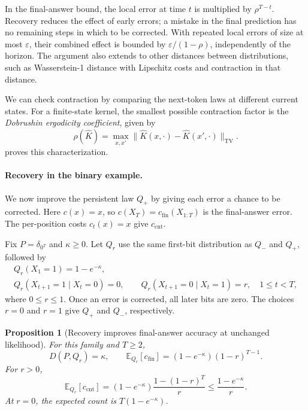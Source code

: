 \documentclass[11pt,twoside]{article}
\newcommand{\E}{\mathbb E}
\newcommand{\KL}{D}
\newcommand{\tv}[1]{\lVert #1\rVert_{\mathrm{TV}}}
\newtheorem{proposition}[theorem]{Proposition}
\theoremstyle{definition}
\theoremstyle{remark}
\begin{document}
In the final-answer bound, the local error at time \(t\) is multiplied
by \(\rho^{T-t}\). Recovery reduces the effect of
early errors; a mistake in the final prediction has no remaining
steps in which to be corrected. With repeated local errors of size
at most \(\varepsilon\), their combined effect is bounded by
\(\varepsilon/(1-\rho)\), independently of the horizon.
The argument also extends to other distances between distributions,
such as Wasserstein-1 distance with Lipschitz costs and contraction
in that distance.

We can check contraction by comparing the next-token laws at different
current states. For a finite-state kernel, the smallest possible contraction
factor is the \emph{Dobrushin ergodicity coefficient}, given by
\begin{equation}
 \rho(\widehat K)
 =\max_{x,x'}\tv{\widehat K(x,\cdot)-\widehat K(x',\cdot)}.
 \label{eq:dobrushin}
\end{equation}
 proves this characterization.

\paragraph{Recovery in the binary example.}
We now improve the persistent law \(Q_+\) by giving
each error a chance to be corrected. Here \(c(x)=x\), so
\(c(X_T)=c_{\mathrm{fin}}(X_{1:T})\) is the final-answer error.
The per-position costs \(c_t(x)=x\) give \(c_{\mathrm{cnt}}\).

Fix \(P=\delta_{0^T}\) and \(\kappa\ge0\). Let \(Q_r\) use the same
first-bit distribution as $Q_-$ and $Q_+$, followed by
\[
 \begin{gathered}
 Q_r(X_1=1)=1-e^{-\kappa},\\
 Q_r(X_{t+1}=1\mid X_t=0)=0,\qquad
 Q_r(X_{t+1}=0\mid X_t=1)=r,\quad 1\le t<T,
 \end{gathered}
\]
where \(0\le r\le1\). Once an error is corrected, all later bits
are zero. The choices \(r=0\) and \(r=1\) give \(Q_+\) and \(Q_-\),
respectively.

\begin{proposition}[Recovery improves final-answer accuracy at unchanged likelihood]
\label{prop:recovery}
For this family and \(T\ge2\),
\begin{equation}
 \KL(P, Q_r)=\kappa,\qquad
 \E_{Q_r}[c_{\mathrm{fin}}]
 =(1-e^{-\kappa})(1-r)^{T-1}.
 \label{eq:endpoint-recovery}
\end{equation}
For \(r>0\),
\begin{equation}
 \E_{Q_r}[c_{\mathrm{cnt}}]
 =(1-e^{-\kappa})\frac{1-(1-r)^T}{r}
 \le\frac{1-e^{-\kappa}}r.
 \label{eq:endpoint-recovery-count}
\end{equation}
At \(r=0\), the expected count is \(T(1-e^{-\kappa})\).
\end{proposition}
\end{document}
